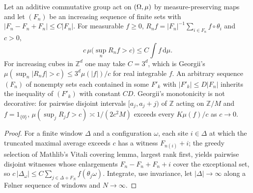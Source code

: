 \begin{lemma}
    \label{lem:erg-14A6}
    \leanok

    Let an additive commutative group act on $(\Omega, \mu)$ by measure-preserving maps and let
    $(F_n)$ be an increasing sequence of finite sets with $|F_n - F_n + F_n| \le C|F_n|$. For
    measurable $f \ge 0$, $R_n f = |F_n|^{-1}\sum_{i \in F_n} f \circ \theta_i$ and $c > 0$,
    \[ c\,\mu\bigl(\sup_n R_n f > c\bigr) \le C \int f\,\mathrm{d}\mu . \]
    For increasing cubes in $\mathbb{Z}^d$ one may take $C = 3^d$, which is Georgii's
    $\mu(\sup_n |R_n f| > c) \le 3^d\mu(|f|)/c$ for real integrable $f$. An arbitrary
    sequence $(F_n)$ of nonempty sets each contained in some $F'_k$ with $|F'_k| \le D|F_n|$
    inherits the inequality of $(F'_k)$ with constant $CD$. Georgii's monotonicity is not
    decorative: for pairwise disjoint intervals $[a_j, a_j + j)$ of $\mathbb Z$ acting on
    $\mathbb Z/M$ and $f = 1_{\{0\}}$, $\mu(\sup_j R_j f > c) \asymp 1/(2c^2M)$ exceeds every
    $K\mu(f)/c$ as $c \to 0$.
\end{lemma}
\begin{proof}
    \leanok

    For a finite window $\Delta$ and a configuration $\omega$, each site $i \in \Delta$ at which
    the truncated maximal average exceeds $c$ has a witness $F_{n(i)} + i$; the greedy selection
    of Mathlib's Vitali covering lemma, largest rank first, yields pairwise disjoint witnesses
    whose enlargements $F_n - F_n + F_n + i$ cover the exceptional set, so
    $c\,|\Delta_\omega| \le C \sum_{j \in \Delta + F_N} f(\theta_j\omega)$. Integrate, use
    invariance, let $|\Delta| \to \infty$ along a F\o lner sequence of windows and $N \to \infty$.
\end{proof}

